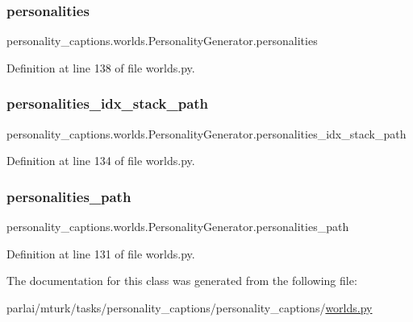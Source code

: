 \subsubsection{\texorpdfstring{personalities}{personalities}}
{\footnotesize\ttfamily personality\+\_\+captions.\+worlds.\+Personality\+Generator.\+personalities}



Definition at line 138 of file worlds.\+py.

\mbox{\label{classpersonality__captions_1_1worlds_1_1PersonalityGenerator_ad1e7cbf0a184bb37c8f5220218cbb524}} 
\subsubsection{\texorpdfstring{personalities\+\_\+idx\+\_\+stack\+\_\+path}{personalities\_idx\_stack\_path}}
{\footnotesize\ttfamily personality\+\_\+captions.\+worlds.\+Personality\+Generator.\+personalities\+\_\+idx\+\_\+stack\+\_\+path}



Definition at line 134 of file worlds.\+py.

\mbox{\label{classpersonality__captions_1_1worlds_1_1PersonalityGenerator_aab870fd5462e825716eb0e2a996671e2}} 
\subsubsection{\texorpdfstring{personalities\+\_\+path}{personalities\_path}}
{\footnotesize\ttfamily personality\+\_\+captions.\+worlds.\+Personality\+Generator.\+personalities\+\_\+path}



Definition at line 131 of file worlds.\+py.



The documentation for this class was generated from the following file\+:\begin{DoxyCompactItemize}
\item 
parlai/mturk/tasks/personality\+\_\+captions/personality\+\_\+captions/\hyperlink{parlai_2mturk_2tasks_2personality__captions_2personality__captions_2worlds_8py}{worlds.\+py}\end{DoxyCompactItemize}
